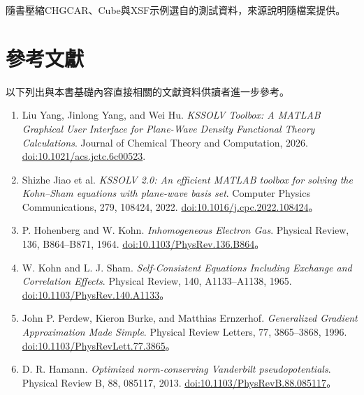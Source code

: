 隨書壓縮CHGCAR、Cube與XSF示例選自的測試資料，來源說明隨檔案提供。

\section{參考文獻}

以下列出與本書基礎內容直接相關的文獻資料供讀者進一步參考。

\begingroup
\small
\RaggedRight
\begin{enumerate}[itemsep=4pt]
\item Liu Yang, Jinlong Yang, and Wei Hu. \textit{KSSOLV Toolbox: A MATLAB\regmark{} Graphical User Interface for Plane-Wave Density Functional Theory Calculations}. Journal of Chemical Theory and Computation, 2026. \href{https://doi.org/10.1021/acs.jctc.6c00523}{doi:10.1021/acs.jctc.6c00523}.
\item Shizhe Jiao et al. \textit{KSSOLV 2.0: An efficient MATLAB\regmark{} toolbox for solving the Kohn--Sham equations with plane-wave basis set}. Computer Physics Communications, 279, 108424, 2022. \href{https://doi.org/10.1016/j.cpc.2022.108424}{doi:10.1016/j.cpc.2022.108424}。
\item P. Hohenberg and W. Kohn. \textit{Inhomogeneous Electron Gas}. Physical Review, 136, B864--B871, 1964. \href{https://doi.org/10.1103/PhysRev.136.B864}{doi:10.1103/PhysRev.136.B864}。
\item W. Kohn and L. J. Sham. \textit{Self-Consistent Equations Including Exchange and Correlation Effects}. Physical Review, 140, A1133--A1138, 1965. \href{https://doi.org/10.1103/PhysRev.140.A1133}{doi:10.1103/PhysRev.140.A1133}。
\item John P. Perdew, Kieron Burke, and Matthias Ernzerhof. \textit{Generalized Gradient Approximation Made Simple}. Physical Review Letters, 77, 3865--3868, 1996. \href{https://doi.org/10.1103/PhysRevLett.77.3865}{doi:10.1103/PhysRevLett.77.3865}。
\item D. R. Hamann. \textit{Optimized norm-conserving Vanderbilt pseudopotentials}. Physical Review B, 88, 085117, 2013. \href{https://doi.org/10.1103/PhysRevB.88.085117}{doi:10.1103/PhysRevB.88.085117}。
\end{enumerate}

\endgroup

